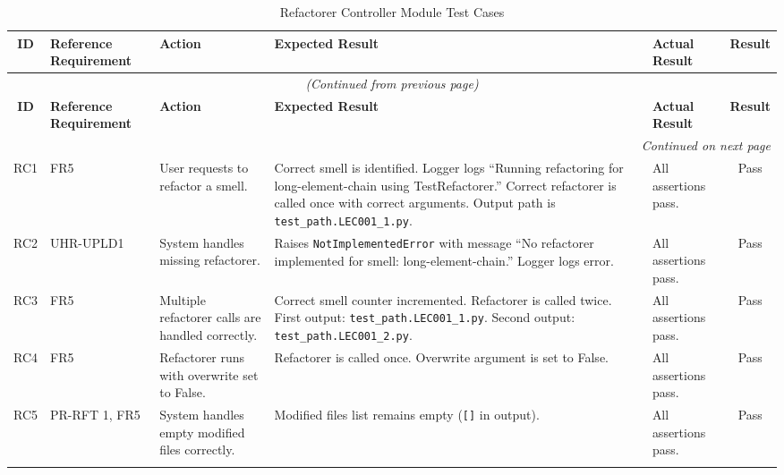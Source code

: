 \documentclass[12pt, titlepage]{article}
\begin{document}
\renewcommand{\arraystretch}{1.2} %

\begin{longtable}{|c|p{2.5cm}|p{2cm}|p{4cm}|p{4cm}|c|}
\hline
\textbf{ID} & \textbf{Reference Requirement} & \textbf{Action} & \textbf{Expected Result} & \textbf{Actual Result} & \textbf{Result} \\ \hline
\endfirsthead

\multicolumn{6}{c}{\textit{(Continued from previous page)}} \\ \hline
\textbf{ID} & \textbf{Reference Requirement} & \textbf{Action} & \textbf{Expected Result} & \textbf{Actual Result} & \textbf{Result} \\ \hline
\endhead

\hline \multicolumn{6}{|r|}{\textit{Continued on next page}} \\ \hline
\endfoot

\hline
\endlastfoot

RC1 & FR5 & User requests to refactor a smell. & Correct smell is identified. Logger logs ``Running refactoring for long-element-chain using TestRefactorer.'' Correct refactorer is called once with correct arguments. Output path is \texttt{test\_path.LEC001\_1.py}. & All assertions pass. & \cellcolor{green!20} Pass \\ \hline
RC2 & UHR-UPLD1 & System handles missing refactorer. & Raises \texttt{NotImplementedError} with message ``No refactorer implemented for smell: long-element-chain.'' Logger logs error. & All assertions pass. & \cellcolor{green!20} Pass \\ \hline
RC3 & FR5 & Multiple refactorer calls are handled correctly. & Correct smell counter incremented. Refactorer is called twice. First output: \texttt{test\_path.LEC001\_1.py}. Second output: \texttt{test\_path.LEC001\_2.py}. & All assertions pass. & \cellcolor{green!20} Pass \\ \hline
RC4 & FR5 & Refactorer runs with overwrite set to False. & Refactorer is called once. Overwrite argument is set to False. & All assertions pass. & \cellcolor{green!20} Pass \\ \hline
RC5 & PR-RFT 1, FR5 & System handles empty modified files correctly. & Modified files list remains empty (\texttt{[]} in output). & All assertions pass. & \cellcolor{green!20} Pass \\ \hline

\caption{Refactorer Controller Module Test Cases}
\label{table:refactorer_controller_tests}
\end{longtable}
\end{document}
